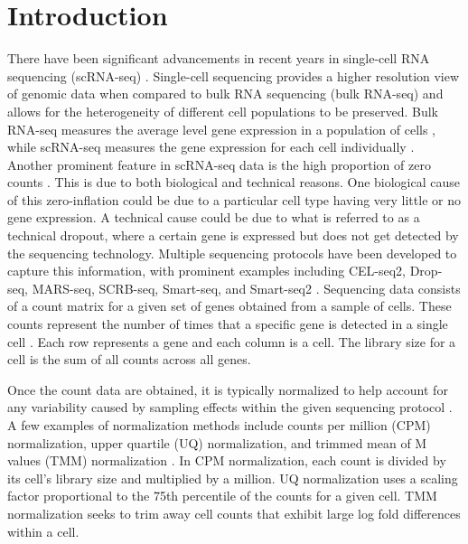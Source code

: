 \documentclass[unnumsec,webpdf,contemporary,large]{oup-authoring-template}%
\theoremstyle{thmstyleone}%
\theoremstyle{thmstyletwo}%
\theoremstyle{thmstylethree}%
\begin{document}

\maketitle


\section{Introduction}
There have been significant advancements in recent years in single-cell RNA sequencing (scRNA-seq) \citep{luecken2019current}. Single-cell sequencing provides a higher resolution view of genomic data when compared to bulk RNA sequencing (bulk RNA-seq) and allows for the heterogeneity of different cell populations to be preserved. Bulk RNA-seq measures the average level gene expression in a population of cells \citep{wang2009rna}, while scRNA-seq measures the gene expression for each cell individually \citep{wang2015advances}.
Another prominent feature in scRNA-seq data is the high proportion of zero counts \citep{vallejos2017normalizing}. This is due to both biological and technical reasons. One biological cause of this zero-inflation could be due to a particular cell type having very little or no gene expression. A technical cause could be due to what is referred to as a technical dropout, where a certain gene is expressed but does not get detected by the sequencing technology.
Multiple sequencing protocols have been developed to capture this information, with prominent examples including CEL-seq2, Drop-seq, MARS-seq, SCRB-seq, Smart-seq, and Smart-seq2 \citep{ziegenhain2017comparative}.
Sequencing data consists of a count matrix for a given set of genes obtained from a sample of cells. These counts represent the number of times that a specific gene is detected in a single cell \citep{grun2015design}. 
Each row represents a gene and each column is a cell. The library size for a cell is the sum of all counts across all genes. 

Once the count data are obtained, it is typically normalized to help account for any variability caused by sampling effects within the given sequencing protocol \citep{grun2015design}.
A few examples of normalization methods include counts per million (CPM) normalization, upper quartile (UQ) normalization, and trimmed mean of M values (TMM) normalization \citep{vallejos2017normalizing}. In CPM normalization, each count is divided by its cell's library size and multiplied by a million. UQ normalization uses a scaling factor proportional to the 75th percentile of the counts for a given cell. TMM normalization seeks to trim away cell counts that exhibit large log fold differences within a cell.
\end{document}
